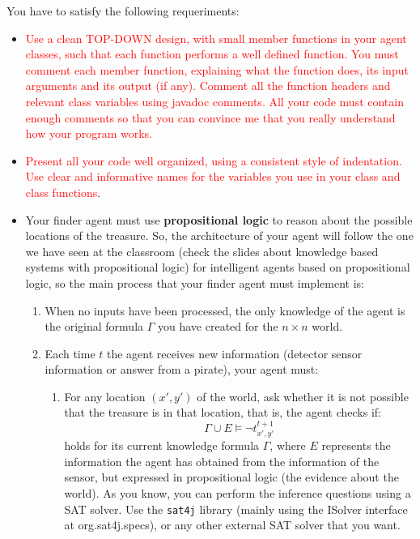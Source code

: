 \documentclass{tufte-handout}
\begin{document}
\begin{fullwidth}
You have to satisfy the following requeriments:
\begin{itemize}
\item \textcolor{red}{Use a clean TOP-DOWN design, with small member functions in your
agent classes, such that each function performs a well defined function.
You must comment each member function, explaining what the function
does, its input arguments and its output (if any).
Comment all the function headers and relevant class variables using javadoc
comments.
All your code must contain enough comments so that you can convince
me that you really understand how your program works.}
\item \textcolor{red}{Present all your code well organized, using a consistent style of indentation. Use clear and informative names for the variables you use in your
class and class functions}.
\item Your finder agent must use {\bf propositional logic} to reason
 about the possible locations of the treasure. So, the architecture
of your agent will follow the one we have seen at the classroom
 (check the slides about knowledge based systems with propositional
logic) for intelligent agents based on propositional
logic, so the main process that your finder agent must   implement is:
\begin{enumerate}
\item When no inputs have been processed, the only knowledge of
the agent is the original formula $\Gamma$ you have created for
the $n\times n$ world.
\item Each time $t$ the agent receives new information (detector sensor information
or answer from a pirate),  your agent must:
\begin{enumerate}
\item For any location $(x',y')$ of the world, ask whether
it is not possible that the treasure is in that location, that is,
the agent checks if:
$$ \Gamma \cup E \models \neg t_{x',y'}^{t+1}  $$
holds for its current knowledge formula $\Gamma$, where $E$ represents
the information the agent has obtained from the information of the sensor,
 but expressed in propositional logic (the evidence about the world).
As you know, you can perform the inference questions using a
 SAT solver. Use the {\tt sat4j} library (mainly using the ISolver interface at org.sat4j.specs), or any other external SAT solver that you want.

\end{enumerate}
\end{enumerate}
\end{itemize}
\end{fullwidth}
\end{document}

